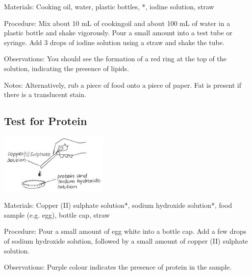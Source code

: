 \begin{multicols}{2}
\begin{description*}
\item[Materials:]{Cooking oil, water, plastic bottles, *, iodine solution, straw}
\item[Procedure:]{Mix about 10 mL of cookingoil and about 100 mL of water in a plastic bottle and shake vigorously. Pour a small amount into a test tube or syringe. Add 3 drops of iodine solution using a straw and shake the tube.}
\item[Observations:]{You should see the formation of a red ring at the top of the solution, indicating the presence of lipids.}
\item[Notes:]{Alternatively, rub a piece of food onto a piece of paper. Fat is present if there is a translucent stain.}
\end{description*}

\subsection{Test for Protein} %

\begin{center}
\includegraphics[width=0.4\textwidth]{./img/vso/food-test-protein.jpg}
\end{center}

\begin{description*}
\item[Materials:]{Copper (II) sulphate solution*, sodium hydroxide solution*, food sample (e.g. egg), bottle cap, straw}
\item[Procedure:]{Pour a small amount of egg white into a bottle cap. Add a few drops of sodium hydroxide solution, followed by a small amount of copper (II) sulphate solution.}
\item[Observations:]{Purple colour indicates the presence of protein in the sample.}
\end{description*}


\end{multicols}
